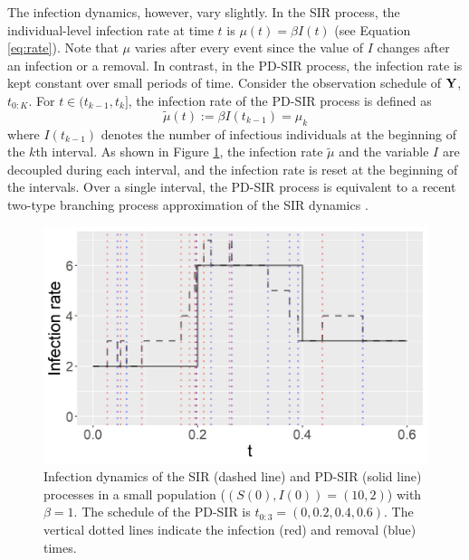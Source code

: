 \documentclass[11pt]{article}
\begin{document}
	The infection dynamics, however, vary slightly.
	In the SIR process, the individual-level infection rate at time $t$ is $\mu(t) = \beta I(t)$ (see Equation \eqref{eq:rate}).
	Note that $\mu$ varies after every event since the value of $I$ changes after an infection or a removal.
	In contrast, in the PD-SIR process, the infection rate is kept constant over small periods of time. Consider the observation schedule of $\mathbf{Y}$, $t_{0:K}$. For $t \in (t_{k-1}, t_k]$, the infection rate of the PD-SIR process is defined as
	$$\tilde{\mu}(t) := \beta I(t_{k - 1}) = \mu_k$$
	where $I(t_{k-1})$ denotes the number of infectious individuals at the beginning of the $k$th interval. As shown in Figure \ref{fig:mu}, the infection rate $\tilde{\mu}$ and the variable $I$ are decoupled during each interval, and the infection rate is reset at the beginning %
	of the intervals. Over a single interval, the PD-SIR process is equivalent to a recent two-type branching process approximation of the SIR dynamics  \cite{Ho.2018}. 
	
	\begin{figure}
		\centering
		\includegraphics[scale = 0.4]{infection_rate_SIR_PDSIR.jpg}
		\caption{Infection dynamics of the SIR (dashed line) and PD-SIR (solid line) processes in a small population ($(S(0), I(0)) = (10,2)$) with $\beta=1$. The schedule of the PD-SIR is $t_{0:3}=(0, 0.2, 0.4, 0.6)$.
		The vertical dotted lines indicate the infection (red) and removal (blue) times.}
		\label{fig:mu}
	\end{figure}
	
\end{document}
